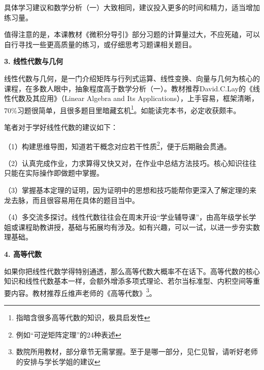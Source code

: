 \documentclass[11pt,oneside]{book}
\begin{document}
\vspace{10pt}

具体学习建议和数学分析（一）大致相同，建议投入更多的时间和精力，适当增加练习量。

\vspace{10pt}

值得注意的是，本课教材《微积分导引》部分习题的计算量过大，不应死磕，可以自行寻找一些更高质量的练习，或仔细思考习题课相关题目。

\vspace{10pt}

\textbf{3. 线性代数与几何} 

线性代数与几何，是一门介绍矩阵与行列式运算、线性变换、向量与几何为核心的课程，在多数人眼中，抽象程度高于数学分析（一）。教材推荐David.C.Lay的《线性代数及其应用》（Linear Algebra and Its Applications），上手容易，框架清晰，70\%习题很简单，且很多题目里暗藏玄机\footnote{指暗含很多高等代数的知识，极具启发性}。如能读完本书，必定收获颇丰。

\vspace{10pt}

笔者对于学好线性代数的建议如下：

\vspace{10pt}

（1）构建思维导图，知道若干概念对应若干性质\footnote{例如“可逆矩阵定理”的24种表述}，便于后期融会贯通。

\vspace{10pt}

（2）认真完成作业，力求算得又快又对，在作业中总结方法技巧。核心知识往往只能在实际操作即做题中掌握。

\vspace{10pt}

（3）掌握基本定理的证明，因为证明中的思想和技巧能帮你更深入了解定理的来龙去脉，而且很容易用在具体的题目当中。

\vspace{10pt}

（4）多交流多探讨。线性代数往往会在周末开设“学业辅导课”，由高年级学长学姐或课程助教讲授，基础与拓展均有涉及。如有兴趣，可以一试，以进一步夯实数理基础。

\vspace{10pt}

\textbf{4. 高等代数}

如果你把线性代数学得特别通透，那么高等代数大概率不在话下。高等代数的核心知识和线性代数基本一样，会额外增添多项式理论、若尔当标准型、内积空间等重要内容。教材推荐丘维声老师的《高等代数》\footnote{数院所用教材，部分章节无需掌握。至于是哪一部分，见仁见智，请听好老师的安排与学长学姐的建议}。
\end{document}
